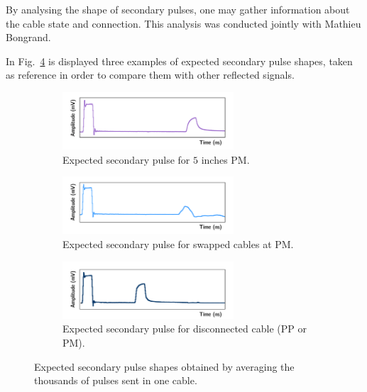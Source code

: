 By analysing the shape of secondary pulses, one may gather information about the cable state and connection.
This analysis was conducted jointly with Mathieu Bongrand.

In Fig.~\ref{fig:} is displayed three examples of expected secondary pulse shapes, taken as reference in order to compare them with other reflected signals.
\begin{figure}[h!]
  \centering
  \begin{subfigure}[b]{1\textwidth}
    \centering
    \includegraphics[width=0.7\textwidth]{commissioning/fig_commissioning/normal_pulse_5.pdf}
    \captionsetup{justification=centering}
    \caption{Expected secondary pulse for $5$ inches PM.
      \label{subfig:normal_5}}
  \end{subfigure}
  \begin{subfigure}[b]{1\textwidth}
    \centering
    \includegraphics[width=0.7\textwidth]{commissioning/fig_commissioning/anormal_pulse.pdf}
    \captionsetup{justification=centering}
    \caption{Expected secondary pulse for swapped cables at PM.
      \label{subfig:}}
  \end{subfigure}
  \begin{subfigure}[b]{1\textwidth}
    \centering
    \includegraphics[width=0.7\textwidth]{commissioning/fig_commissioning/anormal_pulse_misco.pdf}
    \captionsetup{justification=centering}
    \caption{Expected secondary pulse for disconnected cable (PP or PM).
      \label{subfig:}}
  \end{subfigure}
  \caption{Expected secondary pulse shapes obtained by averaging the thousands of pulses sent in one cable.
    \label{fig:}}
\end{figure}
